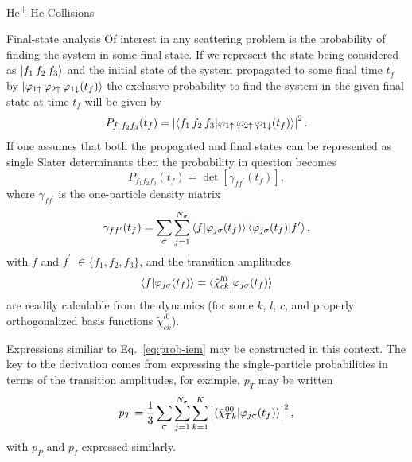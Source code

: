 \documentclass[a5paper, 9 pt]{extreport}
\begin{document}
\begin{chapter}{\texorpdfstring{He\textsuperscript{+}}{He+}-He Collisions \label{chap:hephe}}
\begin{section}{Final-state analysis \label{sec:hephe-det}}
      Of interest in any scattering problem is the probability of finding the system in some final state.
      If we represent the state being considered as $\ket{f_1 \, f_2 \, f_3}$ and the initial state of
      the system propagated to some final time $t_f$ by $\ket{\varphi_{1 \uparrow} \,
      \varphi_{2 \uparrow} \, \varphi_{1 \downarrow} (t_f)}$ the exclusive probability to find the
      system in the given final state at time $t_f$ will be given by
      \begin{equation} \label{eq:finalProb}
         P_{f_1 f_2 f_3}(t_f) = \left| \braket{ f_1 \, f_2 \, f_3 | \varphi_{1 \uparrow} \,
                                       \varphi_{2 \uparrow} \, \varphi_{1 \downarrow} (t_f) } \right|^2.
      \end{equation}
      If one assumes that both the propagated and final states can be represented as single Slater
      determinants then the probability in question becomes
      \begin{equation} \label{eq:detProb}
         P_{f_1 f_2 f_3}(t_f) = \det \left[ \gamma_{f f^\prime}(t_f) \right],
      \end{equation}
      where $\gamma_{f f^\prime}$ is the one-particle density matrix
      \begin{equation} \label{eq:denmat}
         \gamma_{f f^\prime}(t_f) = \sum\limits_{\sigma} \sum\limits_{j = 1}^{N_\sigma}
                               \braket{f | \varphi_{j \sigma}(t_f)}
                               \braket{\varphi_{j \sigma}(t_f) | f^\prime},
      \end{equation}
      with $f$ and $f^\prime$ $\in \{f_1, f_2, f_3\}$, and the transition amplitudes
      \begin{equation}
         \braket{f | \varphi_{j \sigma}(t_f)}
         = \braket{\tilde{\chi}^{l0}_{c k} | \varphi_{j \sigma}(t_f)}
      \end{equation}
      are readily calculable from the dynamics (for some $k$, $l$, $c$, and properly orthogonalized basis
      functions $\tilde{\chi}^{l0}_{c k}$).

      Expressions similiar to Eq.~\eqref{eq:prob-iem} may be constructed in this
      context. The key to the derivation comes from expressing the single-particle probabilities in
      terms of the transition amplitudes, for example, $p_T$ may be written
      \begin{equation} \label{eq:ptTrans}
         p_T = \frac{1}{3} \sum\limits_{\sigma} \sum\limits_{j = 1}^{N_\sigma} \sum\limits_{k = 1}^{K}
               \left| \braket{ \tilde{\chi}^{00}_{T k} | \varphi_{j \sigma}(t_f)}\right|^2,
      \end{equation}
      with $p_P$ and $p_I$ expressed similarly.


\end{section}
\end{chapter}
\end{document}
